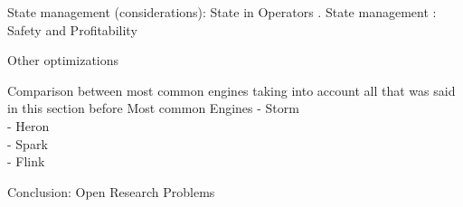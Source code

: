   State management (considerations): State in Operators \cite{R_ger_2019}. State management \cite{R_ger_2019}: Safety and Profitability \cite{Schneider_2013}\cite{R_ger_2019}

  Other optimizations

  Comparison between most common engines taking into account all that was said in this section before
  Most common Engines  \cite{kamburugamuve2013survey}
  - Storm  \cite{kamburugamuve2013survey} \cite{R_ger_2019}\\
  - Heron \cite{R_ger_2019}\\
  - Spark \cite{R_ger_2019}\\
  - Flink \cite{R_ger_2019}

  Conclusion: Open Research Problems \cite{Schneider_2013}

